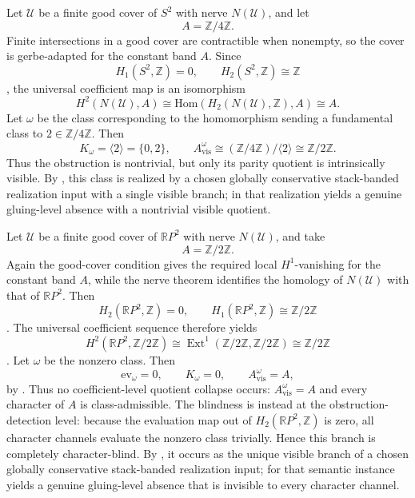 \begin{example}\label{ex:s2-visible-quotient}
Let $\mathcal U$ be a finite good cover of $S^2$ with nerve $N(\mathcal U)$, and let
\[
A=\mathbb Z/4\mathbb Z.
\]
Finite intersections in a good cover are contractible when nonempty, so the cover is gerbe-adapted for the constant band $A$.
Since
\[
H_1(S^2,\mathbb Z)=0,
\qquad
H_2(S^2,\mathbb Z)\cong \mathbb Z
\]
\cite[Secs.~2.1, 2.2]{Hatcher2002}, the universal coefficient map is an isomorphism
\[
H^2(N(\mathcal U),A)\cong \mathrm{Hom}(H_2(N(\mathcal U),\mathbb Z),A)\cong A.
\]
Let $\omega$ be the class corresponding to the homomorphism sending a fundamental class to $2\in\mathbb Z/4\mathbb Z$. Then
\[
K_{\omega}=\langle 2\rangle=\{0,2\},
\qquad
A_{\mathrm{vis}}^{\omega}\cong (\mathbb Z/4\mathbb Z)/\langle 2\rangle\cong \mathbb Z/2\mathbb Z.
\]
Thus the obstruction is nontrivial, but only its parity quotient is intrinsically visible. By , this class is realized by a chosen globally conservative stack-banded realization input with a single visible branch; in that realization  yields a genuine gluing-level absence with a nontrivial visible quotient.
\end{example}

\begin{example}\label{ex:rp2-character-blind}
Let $\mathcal U$ be a finite good cover of $\mathbb{R}P^2$ with nerve $N(\mathcal U)$, and take
\[
A=\mathbb Z/2\mathbb Z.
\]
Again the good-cover condition gives the required local $H^1$-vanishing for the constant band $A$, while the nerve theorem identifies the homology of $N(\mathcal U)$ with that of $\mathbb{R}P^2$.
Then
\[
H_2(\mathbb{R}P^2,\mathbb Z)=0,
\qquad
H_1(\mathbb{R}P^2,\mathbb Z)\cong \mathbb Z/2\mathbb Z
\]
\cite[Sec.~2.2]{Hatcher2002}. The universal coefficient sequence therefore yields
\[
H^2(\mathbb{R}P^2,\mathbb Z/2\mathbb Z)
\cong
\operatorname{Ext}^1(\mathbb Z/2\mathbb Z,\mathbb Z/2\mathbb Z)
\cong
\mathbb Z/2\mathbb Z
\]
\cite[Sec.~3.1]{Hatcher2002}. Let $\omega$ be the nonzero class. Then
\[
\mathrm{ev}_{\omega}=0,
\qquad
K_{\omega}=0,
\qquad
A_{\mathrm{vis}}^{\omega}=A,
\]
by . Thus no coefficient-level quotient
collapse occurs: $A_{\mathrm{vis}}^\omega=A$ and every character of $A$ is
class-admissible. The blindness is instead at the obstruction-detection level:
because the evaluation map out of $H_2(\mathbb{R}P^2,\mathbb Z)$ is zero, all
character channels evaluate the nonzero class trivially. Hence this branch is
completely character-blind. By , it occurs
as the unique visible branch of a chosen globally conservative stack-banded
realization input; for that semantic instance 
yields a genuine gluing-level absence that is invisible to every character
channel.
\end{example}


